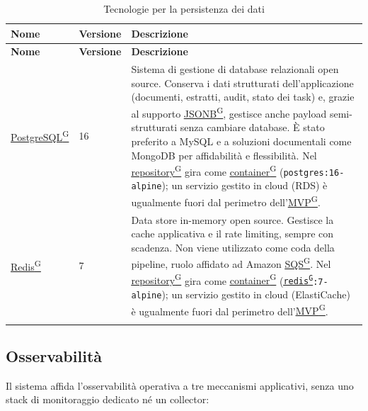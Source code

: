 \documentclass[a4paper,12pt]{article}
\providecommand{\glslink}[2]{\href{https://alittlebyte-19.github.io/Documentazione/glossario.html\#gls-#1}{\underline{#2}\textsuperscript{\scriptsize G}}}
\begin{document}
\renewcommand{\arraystretch}{1.3}
{\small
\setlength{\LTleft}{0pt}
\setlength{\LTright}{0pt}
\begin{longtable}{|p{3cm}|p{1.8cm}|p{9.7cm}|}
    \hline
    \rowcolor{gray!20}
    \textbf{Nome} & \textbf{Versione} & \textbf{Descrizione} \\
    \hline
    \endfirsthead
    \hline
    \rowcolor{gray!20}
    \textbf{Nome} & \textbf{Versione} & \textbf{Descrizione} \\
    \hline
    \endhead
    \glslink{postgresql}{PostgreSQL} & 16 & Sistema di gestione di database relazionali open source. Conserva i dati strutturati dell'applicazione (documenti, estratti, audit, stato dei task) e, grazie al supporto \glslink{jsonb}{JSONB}, gestisce anche payload semi-strutturati senza cambiare database. È stato preferito a MySQL e a soluzioni documentali come MongoDB per affidabilità e flessibilità. Nel \glslink{repository}{repository} gira come \glslink{container}{container} (\texttt{postgres:16-alpine}); un servizio gestito in cloud (RDS) è ugualmente fuori dal perimetro dell'\glslink{mvp-minimum-viable-product}{MVP}. \\
    \hline
    \glslink{redis}{Redis} & 7 & Data store in-memory open source. Gestisce la cache applicativa e il rate limiting, sempre con scadenza. Non viene utilizzato come coda della pipeline, ruolo affidato ad Amazon \glslink{sqs-simple-queue-service}{SQS}. Nel \glslink{repository}{repository} gira come \glslink{container}{container} (\texttt{\glslink{redis}{redis}:7-alpine}); un servizio gestito in cloud (ElastiCache) è ugualmente fuori dal perimetro dell'\glslink{mvp-minimum-viable-product}{MVP}. \\
    \hline
    \caption{Tecnologie per la persistenza dei dati}
\end{longtable}
}

\subsection{Osservabilità}

Il sistema affida l'osservabilità operativa a tre meccanismi applicativi, senza uno stack di monitoraggio dedicato né un collector:
\end{document}
